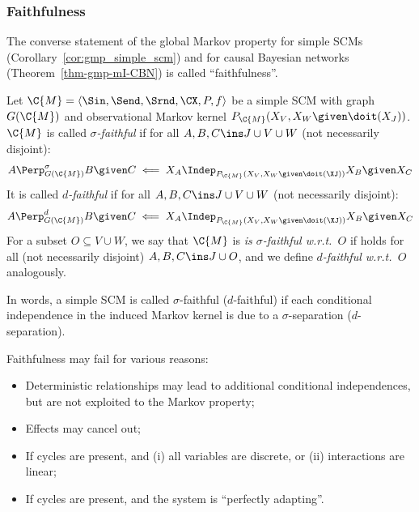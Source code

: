 \subsubsection{Faithfulness}

The converse statement of the global Markov property for simple SCMs (Corollary~\ref{cor:gmp_simple_scm})
and for causal Bayesian networks (Theorem~\ref{thm-gmp-mI-CBN}) is called ``faithfulness''.
\begin{Def}
  Let $\C{M} = \langle \Sin, \Send, \Srnd, \CX, P, f \rangle$ be a simple SCM with graph $G(\C{M})$
  and observational Markov kernel $P_{\C{M}}(X_V,X_W \given \doit(X_J))$.
  $\C{M}$ is called \emph{$\sigma$-faithful} if 
  for all $A, B, C \ins J \cup V \cup W$ (not necessarily disjoint):
  \begin{equation}\label{eq:sigma_faithful}
    A \Perp^\sigma_{G(\C{M})} B \given C \impliedby X_A \Indep_{P_{\C{M}}(X_V,X_W \given \doit(\XJ))} X_B \given X_C
  \end{equation}
  It is called \emph{$d$-faithful} if
  for all $A, B, C \ins J \cup V \cup W$ (not necessarily disjoint):
  \begin{equation}\label{eq:d_faithful}
    A \Perp^d_{G(\C{M})} B \given C \impliedby X_A \Indep_{P_{\C{M}}(X_V,X_W \given \doit(\XJ))} X_B \given X_C
  \end{equation}
  For a subset $O \subseteq V \cup W$, we say that $\C{M}$ is \emph{is $\sigma$-faithful w.r.t.\ $O$} if
   holds for all (not necessarily disjoint) $A, B, C \ins J \cup O$, and we define
  \emph{$d$-faithful w.r.t.\ $O$} analogously.
\end{Def}
In words, a simple SCM is called $\sigma$-faithful ($d$-faithful) if each conditional independence in the induced Markov kernel
is due to a $\sigma$-separation ($d$-separation).

Faithfulness may fail for various reasons:
\begin{itemize}
  \item Deterministic relationships may lead to additional conditional independences, but are not exploited to the Markov property;
  \item Effects may cancel out;
  \item If cycles are present, and (i) all variables are discrete, or (ii) interactions are linear;
  \item If cycles are present, and the system is ``perfectly adapting''.
\end{itemize}

